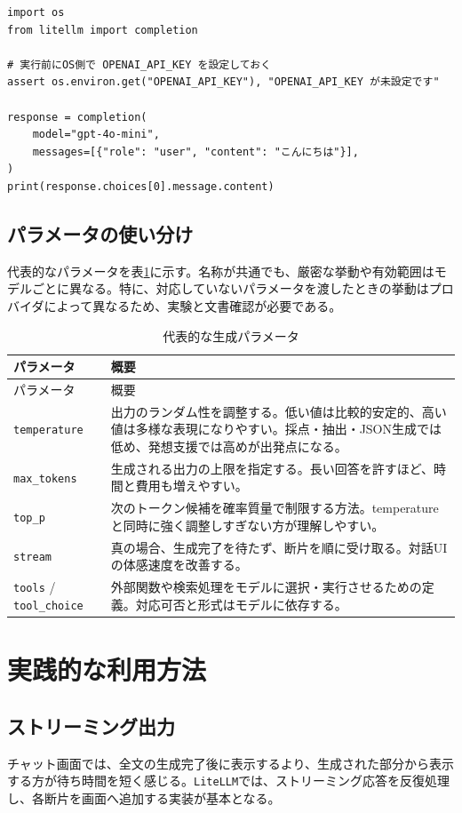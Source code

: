 \documentclass[11pt,a4paper]{bxjsarticle}
\newcommand{\litellm}{\texttt{LiteLLM}}
\begin{document}
\begin{lstlisting}[style=python,caption={環境変数からAPIキーを読む例}]
import os
from litellm import completion

# 実行前にOS側で OPENAI_API_KEY を設定しておく
assert os.environ.get("OPENAI_API_KEY"), "OPENAI_API_KEY が未設定です"

response = completion(
    model="gpt-4o-mini",
    messages=[{"role": "user", "content": "こんにちは"}],
)
print(response.choices[0].message.content)
\end{lstlisting}

\subsection{パラメータの使い分け}
代表的なパラメータを表\ref{tab:param}に示す。名称が共通でも、厳密な挙動や有効範囲はモデルごとに異なる。特に、対応していないパラメータを渡したときの挙動はプロバイダによって異なるため、実験と文書確認が必要である。

\begin{longtable}{p{35mm}p{105mm}}
\caption{代表的な生成パラメータ}\label{tab:param}\\
\toprule
パラメータ & 概要 \\
\midrule
\endfirsthead
\toprule
パラメータ & 概要 \\
\midrule
\endhead
\texttt{temperature} & 出力のランダム性を調整する。低い値は比較的安定的、高い値は多様な表現になりやすい。採点・抽出・JSON生成では低め、発想支援では高めが出発点になる。\\
\texttt{max\_tokens} & 生成される出力の上限を指定する。長い回答を許すほど、時間と費用も増えやすい。\\
\texttt{top\_p} & 次のトークン候補を確率質量で制限する方法。temperatureと同時に強く調整しすぎない方が理解しやすい。\\
\texttt{stream} & 真の場合、生成完了を待たず、断片を順に受け取る。対話UIの体感速度を改善する。\\
\texttt{tools} / \texttt{tool\_choice} & 外部関数や検索処理をモデルに選択・実行させるための定義。対応可否と形式はモデルに依存する。\\
\bottomrule
\end{longtable}

\section{実践的な利用方法}
\subsection{ストリーミング出力}
チャット画面では、全文の生成完了後に表示するより、生成された部分から表示する方が待ち時間を短く感じる。\litellm{}では、ストリーミング応答を反復処理し、各断片を画面へ追加する実装が基本となる。
\end{document}

